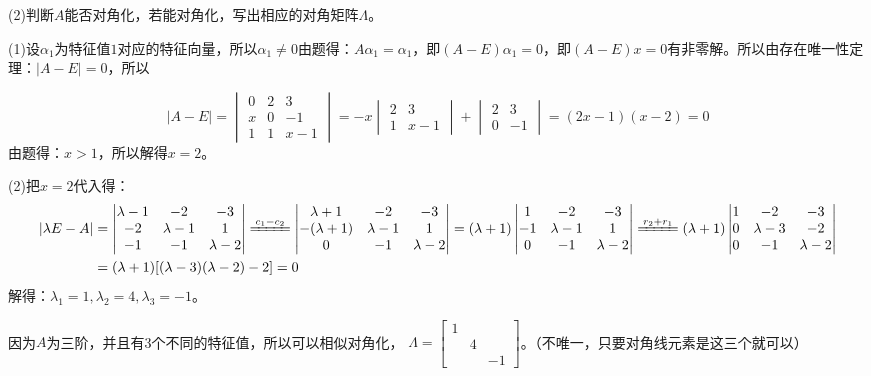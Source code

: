 \documentclass{article}
\begin{document}
(2)判断$A$能否对角化，若能对角化，写出相应的对角矩阵$\Lambda$。

\begin{jie}
(1)设$\alpha_1$为特征值$1$对应的特征向量，所以$\alpha_1\neq 0$由题得：$A\alpha_1=\alpha_1$，即$(A-E)\alpha_1=0$，即$(A-E)x=0$有非零解。所以由存在唯一性定理：$|A-E|=0$，所以

\begin{equation*}
|A-E|=
\begin{vmatrix}
  0 & 2 & 3 \\
  x & 0 & -1 \\
  1 & 1 & x-1
\end{vmatrix}=-x
\begin{vmatrix}
 2 & 3 \\
1 & x-1
\end{vmatrix}+
\begin{vmatrix}
 2 & 3 \\
0 & -1
\end{vmatrix}=(2x-1)(x-2)=0
\end{equation*}
由题得：$x>1$，所以解得$x=2$。

(2)把$x=2$代入得：
\begin{align*}
|\lambda E-A|&=
\begin{vmatrix}
  \lambda-1 & -2 & -3 \\
  -2 & \lambda-1 & 1 \\
  -1 & -1 & \lambda-2
\end{vmatrix}\xlongequal{c_{1}-c_{2}}
\begin{vmatrix}
  \lambda+1 & -2 & -3 \\
  -(\lambda+1) & \lambda-1 & 1 \\
  0 & -1 & \lambda-2
\end{vmatrix}=(\lambda+1)
\begin{vmatrix}
  1 & -2 & -3 \\
  -1 & \lambda-1 & 1 \\
  0 & -1 & \lambda-2
\end{vmatrix}\xlongequal{r_{2}+r_{1}}
(\lambda+1)
\begin{vmatrix}
  1 & -2 & -3 \\
  0 & \lambda-3 & -2 \\
  0 & -1 & \lambda-2
\end{vmatrix}\\
&=(\lambda+1)[(\lambda-3)(\lambda-2)-2]=0
\end{align*}
解得：$\lambda_1=1,\lambda_2=4,\lambda_3=-1$。

因为$A$为三阶，并且有3个不同的特征值，所以可以相似对角化，
$
\Lambda=
\begin{bmatrix}
  1 & & \\
    & 4 &\\
    &&-1
\end{bmatrix}
$。\textcolor[rgb]{1.00,0.00,0.00}{（不唯一，只要对角线元素是这三个就可以）}
\end{jie}
\end{document}
